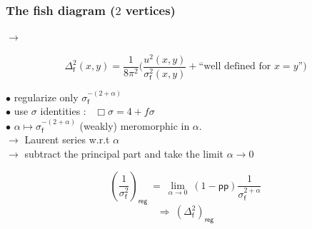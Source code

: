 \documentclass[9pt]{beamer}
\newcommand{\pp}{\mathsf{pp}} %
\newcommand{\fsf}{\mathsf{f}}
\begin{document}
\begin{frame}[label=fish]

\frametitle{The fish diagram ($2$ vertices)}



\begin{minipage}{0.2\linewidth}
\centering
\begin{figure}
\end{figure}
\end{minipage}
\hspace*{-8pt}
$\longrightarrow$
\hspace{5pt}
\begin{minipage}{0.7\linewidth}
\vspace*{-4pt}
\begin{equation*}
\Delta_\fsf^2(x,y) = \frac{1}{8 \pi^2} \bigg( \frac{u^2(x,y)}{\sigma_\fsf^2(x,y)} +  
\mbox{``well defined for $x=y$''}
\bigg)
\end{equation*}
\end{minipage}



\vspace*{20pt}

$\bullet$ regularize only $\sigma_\fsf^{-(2+\alpha)}$ \\

$\bullet$ use $\sigma$ identities : \ $ \Box \sigma = 4 + f \sigma $ \\
 
$\bullet$ $\alpha \mapsto \sigma_\fsf^{-(2+\alpha)}$ (weakly) meromorphic in $\alpha$. \\
\quad $\to$ Laurent series w.r.t $\alpha$ \\
\quad $\to$ subtract the principal part and take the limit $\alpha \to 0$
 
\begin{equation*}
\left(\frac{1}{\sigma_\fsf^2}\right)_\mathsf{reg} \ = \ \lim_{\alpha \to 0} \ \left( 1 - \pp \right) \frac{1}{\sigma_\fsf^{2+\alpha}} 
\end{equation*}
\begin{equation*}
\Longrightarrow \ \left(\Delta_\fsf^{2}\right)_\mathsf{reg} 
\end{equation*}
 
\hfill \hyperlink{details_fish}{}

\end{frame}
\end{document}
